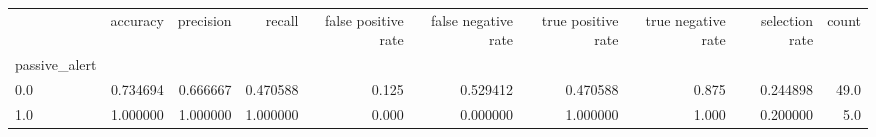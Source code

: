\begin{tabular}{lrrrrrrrrr}
\toprule
{} &  accuracy &  precision &    recall &  false positive rate &  false negative rate &  true positive rate &  true negative rate &  selection rate &  count \\
passive\_alert &           &            &           &                      &                      &                     &                     &                 &        \\
\midrule
0.0           &  0.734694 &   0.666667 &  0.470588 &                0.125 &             0.529412 &            0.470588 &               0.875 &        0.244898 &   49.0 \\
1.0           &  1.000000 &   1.000000 &  1.000000 &                0.000 &             0.000000 &            1.000000 &               1.000 &        0.200000 &    5.0 \\
\bottomrule
\end{tabular}
